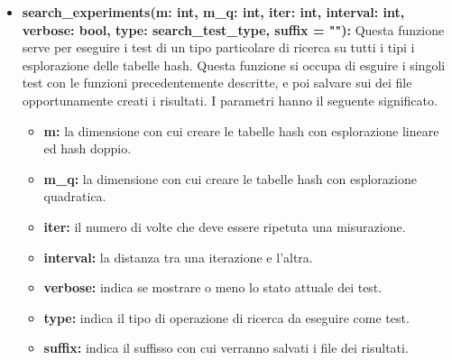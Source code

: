 \documentclass{article}
\newcommand{\newlineitem}[1]{\item \textbf{#1} \hfill \break}
\begin{document}
\begin{itemize}
\newlineitem{search\_experiments(m: int, m\_q: int, iter: int, interval: int, verbose: bool, type: search\_test\_type,  suffix = ""):}
Questa funzione serve per eseguire i test di un tipo particolare di ricerca su tutti i tipi i esplorazione delle tabelle hash. Questa funzione si occupa di esguire i singoli test con le funzioni precedentemente descritte, e poi salvare sui dei file opportunamente creati i risultati. I parametri hanno il seguente significato.
\begin{itemize}
\item \textbf{m:} la dimensione con cui creare le tabelle hash con esplorazione lineare ed hash doppio.
\item \textbf{m\_q:} la dimensione con cui creare le tabelle hash con esplorazione quadratica.
\item \textbf{iter:} il numero di volte che deve essere ripetuta una misurazione.
\item \textbf{interval:} la distanza tra una iterazione e l'altra.
\item \textbf{verbose:} indica se mostrare o meno lo stato attuale dei test.
\item \textbf{type:} indica il tipo di operazione di ricerca da eseguire come test.
\item \textbf{suffix:} indica il suffisso con cui verranno salvati i file dei risultati.
\end{itemize}


\end{itemize}
\end{document}
